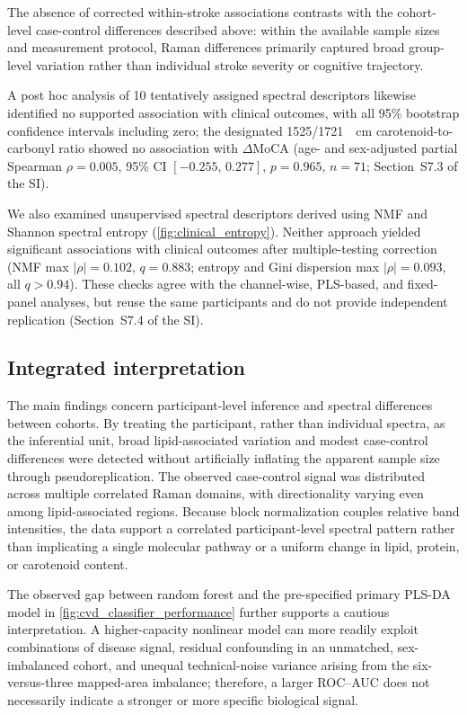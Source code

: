 \documentclass[preprint,12pt]{elsarticle}
\begin{document}
The absence of corrected within-stroke associations contrasts with the cohort-level case-control differences described above: within the available sample sizes and measurement protocol, Raman differences primarily captured broad group-level variation rather than individual stroke severity or cognitive trajectory.

A post hoc analysis of 10 tentatively assigned spectral descriptors likewise identified no supported association with clinical outcomes, with all 95\% bootstrap confidence intervals including zero; the designated 1525/1721~\si{\per\centi\metre} carotenoid-to-carbonyl ratio showed no association with $\Delta$MoCA (age- and sex-adjusted partial Spearman $\rho=0.005$, 95\% CI $[-0.255,\,0.277]$, $p=0.965$, $n=71$; Section~S7.3 of the SI).

We also examined unsupervised spectral descriptors derived using NMF and Shannon spectral entropy (\cref{fig:clinical_entropy}). Neither approach yielded significant associations with clinical outcomes after multiple-testing correction (NMF max $|\rho|=0.102$, $q=0.883$; entropy and Gini dispersion max $|\rho|=0.093$, all $q>0.94$). These checks agree with the channel-wise, PLS-based, and fixed-panel analyses, but reuse the same participants and do not provide independent replication (Section~S7.4 of the SI).


\subsection{Integrated interpretation} 
\label{subsec:interpretation}

The main findings concern participant-level inference and spectral differences between cohorts. By treating the participant, rather than individual spectra, as the inferential unit, broad lipid-associated variation and modest case-control differences were detected without artificially inflating the apparent sample size through pseudoreplication. The observed case-control signal was distributed across multiple correlated Raman domains, with directionality varying even among lipid-associated regions. Because block normalization couples relative band intensities, the data support a correlated participant-level spectral pattern rather than implicating a single molecular pathway or a uniform change in lipid, protein, or carotenoid content.

The observed gap between random forest and the pre-specified primary PLS-DA model in \cref{fig:cvd_classifier_performance} further supports a cautious interpretation. A higher-capacity nonlinear model can more readily exploit combinations of disease signal, residual confounding in an unmatched, sex-imbalanced cohort, and unequal technical-noise variance arising from the six-versus-three mapped-area imbalance; therefore, a larger ROC--AUC does not necessarily indicate a stronger or more specific biological signal.
\end{document}
